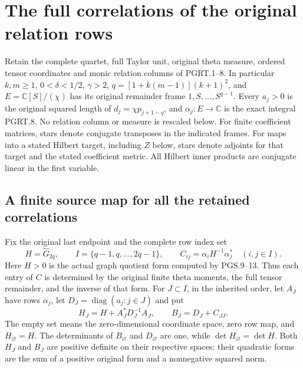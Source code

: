 \section{The full correlations of the original relation rows}
\label{GraphV2:sec:pgrc}

Retain the complete quartet, full Taylor unit, original theta measure,
ordered tensor coordinates and monic relation columns of PGRT.1--8.
In particular $k,m\geq1$, $0<\delta<1/2$, $\gamma>2$,
$q=[1+k(m-1)](k+1)^2$, and $E=\mathbb{C}[S]/(\chi)$ has its
original remainder frame $1,S,\ldots,S^{q-1}$. Every $a_j>0$ is
the original squared length of $d_j=\chi p_{j+1-q}$, and
$\alpha_j:E\to\mathbb{C}$ is the exact integral PGRT.8. No relation
column or measure is rescaled below. For finite coefficient matrices,
stars denote conjugate transposes in the indicated frames. For maps
into a stated Hilbert target, including $Z$ below, stars denote
adjoints for that target and the stated coefficient metric. All
Hilbert inner products are conjugate linear in the first variable.

\subsection{A finite source map for all the retained correlations}

Fix the original last endpoint and the complete row index set
\[
 H=\widehat G_{2q},\qquad I=\{q-1,q,\ldots,2q-1\},\qquad
 C_{ij}=\alpha_iH^{-1}\alpha_j^*\quad(i,j\in I).
 \tag{PGRC.1}\label{GraphV2:eq:pgrc-original-gram}
\]
Here $H>0$ is the actual graph quotient form computed by PGS.9--13.
Thus each entry of $C$ is determined by the original finite theta
moments, the full tensor remainder, and the inverse of that form.
For $J\subset I$, in the inherited order, let $A_J$ have rows
$\alpha_j$, let $D_J=\operatorname{diag}(a_j:j\in J)$ and put
\[
 H_J=H+A_J^*D_J^{-1}A_J,
 \qquad B_J=D_J+C_{JJ}.
 \tag{PGRC.2}\label{GraphV2:eq:pgrc-subset-forms}
\]
The empty set means the zero-dimensional coordinate space, zero
row map, and $H_\varnothing=H$. The determinants of
$B_\varnothing$ and $D_\varnothing$ are one, while
$\det H_\varnothing=\det H$. Both
$H_J$ and $B_J$ are positive definite on their respective spaces:
their quadratic forms are the sum of a positive original form
and a nonnegative squared norm.


